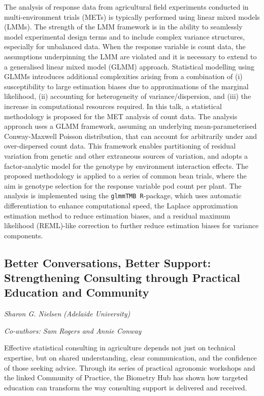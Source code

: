 \documentclass[
]{scrreprt}
\begin{document}
The analysis of response data from agricultural field experiments
conducted in multi-environment trials (METs) is typically performed
using linear mixed models (LMMs). The strength of the LMM framework is
in the ability to seamlessly model experimental design terms and to
include complex variance structures, especially for unbalanced data.
When the response variable is count data, the assumptions underpinning
the LMM are violated and it is necessary to extend to a generalised
linear mixed model (GLMM) approach. Statistical modelling using GLMMs
introduces additional complexities arising from a combination of (i)
susceptibility to large estimation biases due to approximations of the
marginal likelihood, (ii) accounting for heterogeneity of
variance/dispersion, and (iii) the increase in computational resources
required. In this talk, a statistical methodology is proposed for the
MET analysis of count data. The analysis approach uses a GLMM framework,
assuming an underlying mean-parameterised Conway-Maxwell Poisson
distribution, that can account for arbitrarily under and over-dispersed
count data. This framework enables partitioning of residual variation
from genetic and other extraneous sources of variation, and adopts a
factor-analytic model for the genotype by environment interaction
effects. The proposed methodology is applied to a series of common bean
trials, where the aim is genotype selection for the response variable
pod count per plant. The analysis is implemented using the
\texttt{glmmTMB\ R}-package, which uses automatic differentiation to
enhance computational speed, the Laplace approximation estimation method
to reduce estimation biases, and a residual maximum likelihood
(REML)-like correction to further reduce estimation biases for variance
components.

\subsection{Better Conversations, Better Support: Strengthening
Consulting through Practical Education and
Community}\label{better-conversations-better-support-strengthening-consulting-through-practical-education-and-community}

\emph{Sharon G. Nielsen} \emph{(Adelaide
University)}

\emph{Co-authors: Sam Rogers and Annie Conway}

\setlength{\parskip}{0.5em}

Effective statistical consulting in agriculture depends not just on
technical expertise, but on shared understanding, clear communication,
and the confidence of those seeking advice. Through its series of
practical agronomic workshops and the linked Community of Practice, the
Biometry Hub has shown how targeted education can transform the way
consulting support is delivered and received.
\end{document}
